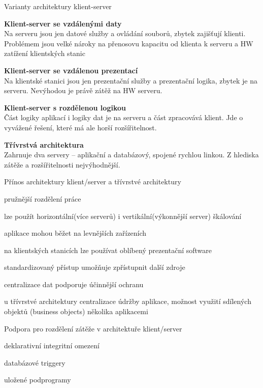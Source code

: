 \begin{obecne}{Varianty architektury klient-server}
\begin{pitemize}
    \item \textbf{Klient-server se vzdálenými daty} \\
Na serveru jsou jen datové služby a ovládání souborů, zbytek zajišťují klienti. Problémem jsou velké nároky na přenosovu kapacitu od klienta k serveru a HW zatížení klientských stanic
    \item \textbf{Klient-server se vzdálenou prezentací} \\
Na klientské stanici jsou jen prezentační služby a prezentační logika, zbytek je na serveru. Nevýhodou je právě zátěž na HW serveru.
    \item \textbf{Klient-server s rozdělenou logikou} \\
Část logiky aplikací i logiky dat je na serveru a část zpracovává klient. Jde o vyvážené řešení, které má ale horší rozšířitelnost.
    \item \textbf{Třívrstvá architektura} \\
Zahrnuje dva servery -- aplikační a databázový, spojené rychlou linkou. Z hlediska zátěže a rozšířitelnosti nejvýhodnější.
\end{pitemize}
\end{obecne}

\begin{obecne}{Přínos architektury klient/server a třívrstvé architektury}
\begin{pitemize}
 \item pružnější rozdělení práce \item lze použít horizontální(více serverů) i vertikální(výkonnější server) škálování \item aplikace mohou běžet na levnějších zařízeních \item na klientských stanicích lze používat oblíbený prezentační software \item standardizovaný přístup umožňuje zpřístupnit další zdroje \item centralizace dat podporuje účinnější ochranu \item u třívrstvé architektury centralizace údržby aplikace, možnost využití sdílených objektů (business objects) několika aplikacemi
\end{pitemize}
\end{obecne}

\begin{obecne}{Podpora pro rozdělení zátěže v architektuře klient/server}
\begin{pitemize}
 \item deklarativní integritní omezení \item databázové triggery \item uložené podprogramy
\end{pitemize}
\end{obecne}


